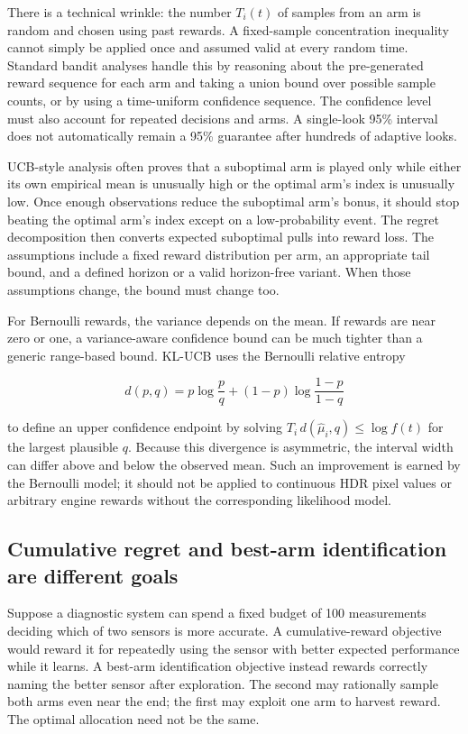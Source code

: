 There is a technical wrinkle: the number \(T_i(t)\) of samples from an arm is random and chosen using past rewards. A fixed-sample concentration inequality cannot simply be applied once and assumed valid at every random time. Standard bandit analyses handle this by reasoning about the pre-generated reward sequence for each arm and taking a union bound over possible sample counts, or by using a time-uniform confidence sequence. The confidence level must also account for repeated decisions and arms. A single-look 95\% interval does not automatically remain a 95\% guarantee after hundreds of adaptive looks.

UCB-style analysis often proves that a suboptimal arm is played only while either its own empirical mean is unusually high or the optimal arm's index is unusually low. Once enough observations reduce the suboptimal arm's bonus, it should stop beating the optimal arm's index except on a low-probability event. The regret decomposition then converts expected suboptimal pulls into reward loss. The assumptions include a fixed reward distribution per arm, an appropriate tail bound, and a defined horizon or a valid horizon-free variant. When those assumptions change, the bound must change too.

For Bernoulli rewards, the variance depends on the mean. If rewards are near zero or one, a variance-aware confidence bound can be much tighter than a generic range-based bound. KL-UCB uses the Bernoulli relative entropy

\[
d(p,q)=p\log\frac pq+(1-p)\log\frac{1-p}{1-q}
\]

to define an upper confidence endpoint by solving \(T_i\,d(\hat\mu_i,q)\le\log f(t)\) for the largest plausible \(q\). Because this divergence is asymmetric, the interval width can differ above and below the observed mean. Such an improvement is earned by the Bernoulli model; it should not be applied to continuous HDR pixel values or arbitrary engine rewards without the corresponding likelihood model.

\subsection{Cumulative regret and best-arm identification are different goals}\label{02-foundations-ii-ch029-cumulative-regret-and-best-arm-identification-are-different-goals}

Suppose a diagnostic system can spend a fixed budget of 100 measurements deciding which of two sensors is more accurate. A cumulative-reward objective would reward it for repeatedly using the sensor with better expected performance while it learns. A best-arm identification objective instead rewards correctly naming the better sensor after exploration. The second may rationally sample both arms even near the end; the first may exploit one arm to harvest reward. The optimal allocation need not be the same.

